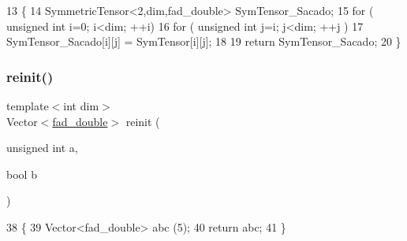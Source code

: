 \begin{DoxyCode}
13 \{
14     SymmetricTensor<2,dim,fad\_double> SymTensor\_Sacado;
15      \textcolor{keywordflow}{for} ( \textcolor{keywordtype}{unsigned} \textcolor{keywordtype}{int} i=0; i<dim; ++i)
16         \textcolor{keywordflow}{for} ( \textcolor{keywordtype}{unsigned} \textcolor{keywordtype}{int} j=i; j<dim; ++j )
17             SymTensor\_Sacado[i][j] = SymTensor[i][j];
18      
19      \textcolor{keywordflow}{return} SymTensor\_Sacado;
20 \}
\end{DoxyCode}
\mbox{\label{Sacado-auxiliary__functions_8h_a84c0541927416960b085bb73d2da4cf1}} 
\subsubsection{\texorpdfstring{reinit()}{reinit()}}
{\footnotesize\ttfamily template$<$int dim$>$ \\
Vector$<$\hyperlink{Sacado-auxiliary__functions_8h_a868b94676739e612d9c95940e70892a9}{fad\+\_\+double}$>$ reinit (\begin{DoxyParamCaption}\item[{unsigned int}]{a,  }\item[{bool}]{b }\end{DoxyParamCaption})}


\begin{DoxyCode}
38 \{
39     Vector<fad\_double> abc (5);
40      \textcolor{keywordflow}{return} abc;
41 \}
\end{DoxyCode}
